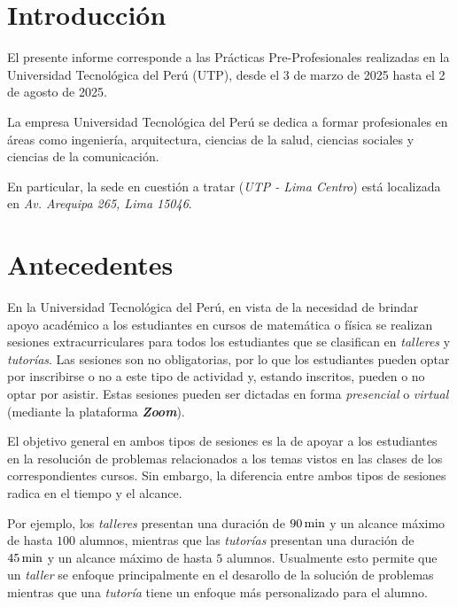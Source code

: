 \documentclass[11pt,a4paper]{book}
\theoremstyle{definition}%
\begin{document}
    \chapter*{Introducción}
        El presente informe corresponde a las Prácticas Pre-Profesionales realizadas en la
        Universidad Tecnológica del Perú (UTP), desde el 3 de marzo de 2025 hasta el 2 de agosto de 2025.
        
        La empresa Universidad Tecnológica del Perú se dedica a formar profesionales en áreas como ingeniería, arquitectura, ciencias de la salud, ciencias sociales y ciencias de la comunicación.
        
        En particular, la sede en cuestión a tratar (\textit{UTP - Lima Centro}) está localizada en \textit{Av. Arequipa 265, Lima 15046}.
        
    \chapter*{Antecedentes}
        En la Universidad Tecnológica del Perú, en vista de la necesidad de brindar apoyo académico a los estudiantes en cursos de matemática o física se realizan sesiones extracurriculares para todos los estudiantes que se clasifican en \textit{talleres} y \textit{tutorías}. Las sesiones son no obligatorias, por lo que los estudiantes pueden optar por inscribirse o no a este tipo de actividad y, estando inscritos, pueden o no optar por asistir. Estas sesiones pueden ser dictadas en forma \textit{presencial} o \textit{virtual} (mediante la plataforma \textbf{\textit{Zoom}}).
        
        El objetivo general en ambos tipos de sesiones es la de apoyar a los estudiantes en la resolución de problemas relacionados a los temas vistos en las clases de los correspondientes cursos. Sin embargo, la diferencia entre ambos tipos de sesiones radica en el tiempo y el alcance.
        
        Por ejemplo, los \textit{talleres} presentan una duración de $90\,\textup{min}$ y un alcance máximo de hasta $100$ alumnos, mientras que las \textit{tutorías} presentan una duración de $45\,\textup{min}$ y un alcance máximo de hasta $5$ alumnos. Usualmente esto permite que un \textit{taller} se enfoque principalmente en el desarollo de la solución de problemas mientras que una \textit{tutoría} tiene un enfoque más personalizado para el alumno.
\end{document}
